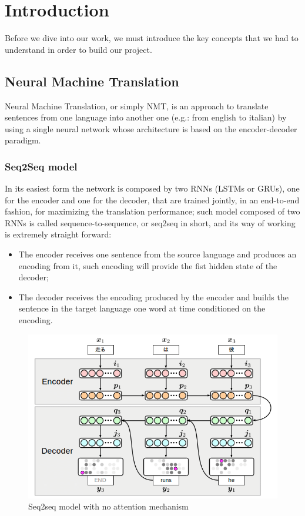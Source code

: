 \section{Introduction}
Before we dive into our work, we must introduce the key concepts that we had to understand in order to build our project.
\subsection{Neural Machine Translation}
Neural Machine Translation, or simply NMT, is an approach to translate sentences from one language into another one (e.g.: from english to italian) by using a single neural network whose architecture is based on the encoder-decoder paradigm.
\vspace{3mm}
\subsubsection{Seq2Seq model}\label{subsubsec:seq2seq_model}
In its easiest form the network is composed by two RNNs (LSTMs or GRUs), one for the encoder and one for the decoder, that are trained jointly, in an end-to-end fashion, for maximizing the translation performance; such model composed of two RNNs is called sequence-to-sequence, or seq2seq in short, and its way of working is extremely straight forward:
\begin{itemize}
    \item The encoder receives one sentence from the source language and produces an encoding from it, such encoding will provide the fist hidden state of the decoder;
    \item The decoder receives the encoding produced by the encoder and builds the sentence in the target language one word at time conditioned on the encoding.
\end{itemize}
\begin{figure}[H]%
    \centering
    \includegraphics[width=0.74\linewidth]{images/seq2seq.png}
    \caption{Seq2seq model with no attention mechanism} %
    \label{fig:seq2seq_model_no_attention}
\end{figure}

